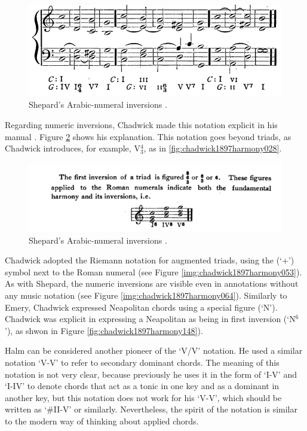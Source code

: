 \begin{figure}
    \centering
    \includegraphics[width=\textwidth]{figures/chapter/2/primary_sources/shepard1896harmony184.png}
    \caption{Shepard's Arabic-numeral inversions \cite{shepard1896harmony}.}
    \label{fig:shepard1896harmony184}
\end{figure}

Regarding numeric inversions, Chadwick made this notation explicit in his manual \cite{chadwick1897harmony}. 
Figure \ref{fig:chadwick1897harmony012} shows his explanation.
This notation goes beyond triads, as Chadwick introduces, for example, V$^\text{4}_\text{3}$, as in \ref{fig:chadwick1897harmony028}.

\begin{figure}
    \centering
    \includegraphics[width=\textwidth]{figures/chapter/2/primary_sources/chadwick1897harmony012.png}
    \caption{Shepard's Arabic-numeral inversions \cite{chadwick1897harmony}.}
    \label{fig:chadwick1897harmony012}
\end{figure}

Chadwick adopted the Riemann notation for augmented triads, using the (`+') symbol next to the Roman numeral (see Figure \ref{img:chadwick1897harmony053}).
As with Shepard, the numeric inversions are visible even in annotations without any music notation (see Figure \ref{img:chadwick1897harmony064}).
Similarly to Emery, Chadwick expressed Neapolitan chords using a special figure (`N').
Chadwick was explicit in expressing a Neapolitan as being in first inversion (`N$^6$'), as shwon in Figure \ref{fig:chadwick1897harmony148}).

Halm can be considered another pioneer of the `V/V' notation.
He used a similar notation `V-V' to refer to secondary dominant chords.
The meaning of this notation is not very clear, because previously he uses it in the form of `I-V' and `I-IV' to denote chords that act as a tonic in one key and as a dominant in another key, but this notation does not work for his `V-V', which should be written as `#II-V' or similarly.
Nevertheless, the spirit of the notation is similar to the modern way of thinking about applied chords.

